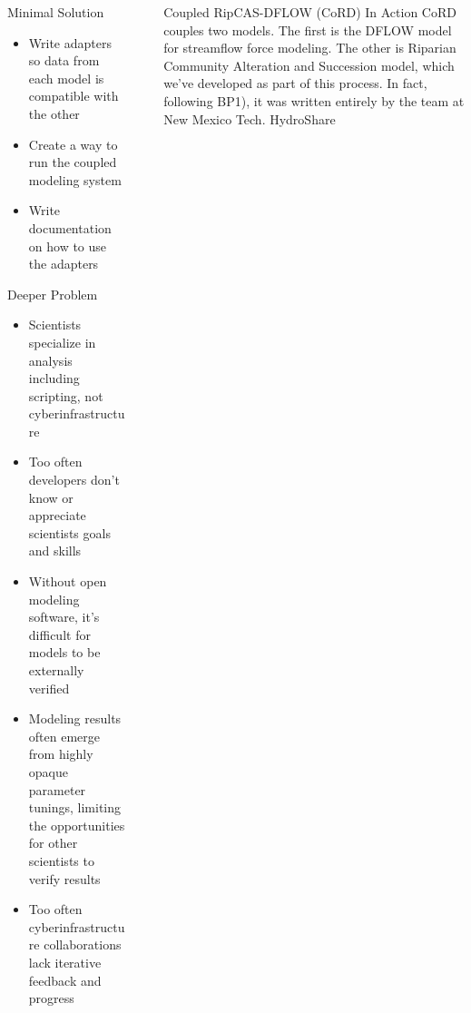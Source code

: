 \documentclass[final]{beamer}
\newlength{\sepwid}
\newlength{\onecolwid}
\newlength{\twocolwid}
\begin{document}
\begin{frame}[t]
\begin{columns}[t]
\begin{column}{\onecolwid}
\begin{block}{Minimal Solution}
    \begin{itemize}
        \item Write adapters so data from each model is compatible with the other
        \item Create a way to run the coupled modeling system
        \item Write documentation on how to use the adapters
    \end{itemize}
\end{block}

\begin{block}{Deeper Problem}
    \begin{itemize}
        \item Scientists specialize in analysis including scripting, not cyberinfrastructure
        \item Too often developers don't know or appreciate scientists goals and skills
        \item Without open modeling software, it's difficult for models to be externally verified
        \item Modeling results often emerge from highly opaque parameter tunings, limiting the opportunities
            for other scientists to verify results
        \item Too often cyberinfrastructure collaborations lack iterative feedback and progress
    \end{itemize}

\end{block}






\end{column} %

\begin{column}{\sepwid}\end{column} %

\begin{column}{\twocolwid} %

    \begin{alertblock}{Coupled RipCAS-DFLOW (CoRD) In Action}
        CoRD couples two models. The first is the DFLOW model for streamflow force modeling. The other is Riparian Community Alteration and
        Succession model, which we've developed as part of this process. In fact, following BP1), it was written entirely by the
        team at New Mexico Tech. HydroShare \cite{Horsburgh2016}


\end{alertblock}
\end{column}
\end{columns}
\end{frame}
\end{document}
